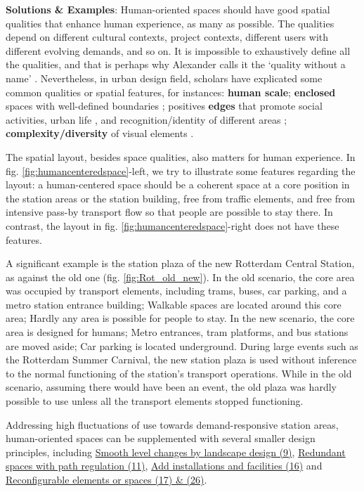 \documentclass[]{article}
\begin{document}
{\textbf{Solutions \& Examples}: Human-oriented spaces should have good spatial qualities that enhance human experience, as many as possible. The qualities depend on different cultural contexts, project contexts, different users with different evolving demands, and so on. It is impossible to exhaustively define all the qualities, and that is perhaps why Alexander calls it the `quality without a name' \citep{alexanderTimelessWayBuilding1979}. Nevertheless, in urban design field, scholars have explicated some common qualities or spatial features, for instances: \textbf{human scale}; \textbf{enclosed} spaces with well-defined boundaries \citep{sitteCityPlanningAccording1889}; positives \textbf{edges} that promote social activities, urban life \citep{gehlLifeBuildings1987, whyteSocialLifeSmall2001}, and recognition/identity of different areas \citep{jacobsDeathLifeGreat1961, lynchImageCity1960}; \textbf{complexity/diversity} of visual elements \citep{ewingMeasuringUnmeasurableUrban2009}. 

The spatial layout, besides space qualities, also matters for human experience.  In fig. \ref{fig:humancenteredspace}-left, we try to illustrate some features regarding the layout: a human-centered space should be a coherent space at a core position in the station areas or the station building, free from traffic elements, and free from intensive pass-by transport flow so that people are possible to stay there. In contrast, the layout in fig. \ref{fig:humancenteredspace}-right does not have these features.

A significant example is the station plaza of the new Rotterdam Central Station, as against the old one (fig. \ref{fig:Rot_old_new}). In the old scenario, the core area was occupied by transport elements, including trams, buses, car parking, and a metro station entrance building; Walkable spaces are located around this core area; Hardly any area is possible for people to stay. In the new scenario, the core area is designed for humans; Metro entrances, tram platforms, and bus stations are moved aside; Car parking is located underground. During large events such as the Rotterdam Summer Carnival, the new station plaza is used without inference to the normal functioning of the station's transport operations. While in the old scenario, assuming there would have been an event, the old plaza was hardly possible to use unless all the transport elements stopped functioning.

Addressing high fluctuations of use towards demand-responsive station areas, human-oriented spaces can be supplemented with several smaller design principles, including \hyperref[(9 10) Smooth level changes by landscape design]{Smooth level changes by landscape design (9)}, \hyperref[(11) Adaptive redundant spaces with path regulation]{Redundant spaces with path regulation (11)}, \hyperref[(16) Add installations and facilities]{Add installations and facilities (16)} and \hyperref[(17 26) Reconfigurable elements or spaces]{Reconfigurable elements or spaces (17) \& (26)}.

}
\end{document}
